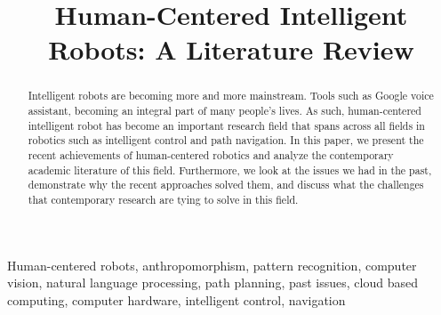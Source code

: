 \documentclass[conference]{IEEEtran}
\begin{document}
\title{Human-Centered Intelligent Robots: A Literature Review\\
}

\author{
\and
{}
}

\maketitle

\begin{abstract}
Intelligent robots are becoming more and more mainstream. Tools such as Google voice assistant, becoming an integral part of many people's lives. As such, human-centered intelligent robot has become an important research field that spans across all fields in robotics such as intelligent control and path navigation. In this paper, we present the recent achievements of human-centered robotics and analyze the contemporary academic literature of this field. Furthermore, we look at the issues we had in the past, demonstrate why the recent approaches solved them, and discuss what the challenges that contemporary research are tying to solve in this field.
\end{abstract}

\begin{IEEEkeywords}
Human-centered robots, anthropomorphism, pattern recognition, computer vision, natural language processing, path planning, past issues, cloud based computing, computer hardware, intelligent control, navigation
\end{IEEEkeywords}
\end{document}
